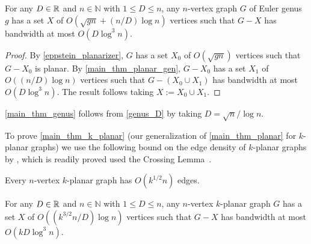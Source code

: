 \documentclass{patmorin}
\renewcommand{\leq}{\leqslant}
\newcommand{\david}[1]{{\color{orange} David: #1}}
\newcommand{\pat}[1]{\textcolor{Blue}{Pat: #1}}
\newcommand{\NN}{\mathbb{N}}
\begin{document}
\begin{lem}
\label{genus_D}
For any $D\in\mathbb{R}$ and $n\in\NN$ with $1\leq D\leq n$, any $n$-vertex graph $G$ of Euler genus $g$ has a set $X$ of $O(\sqrt{gn}+(n/D) \log n)$ vertices such that $G-X$ has bandwidth at most $O(D\log^3 n)$.
\end{lem}

\begin{proof}
By \cref{eppstein_planarizer}, $G$ has a set $X_0$ of $O(\sqrt{gn})$ vertices such that $G-X_0$ is planar.  By \cref{main_thm_planar_gen}, $G-X_0$ has a set $X_1$ of $O((n/D)\log n)$ vertices such that $G-(X_0\cup X_1)$ has bandwidth at most $O(D\log^3 n)$. The result follows taking $X:=X_0\cup X_1$.
\end{proof}

\cref{main_thm_genus} follows from \cref{genus_D} by taking $D=\sqrt{n}/\log n$.

 
To prove \cref{main_thm_k_planar} (our generalization of \cref{main_thm_planar} for $k$-planar graphs) we use the following bound on the edge density of $k$-planar graphs by \citet{PachToth97}, which is readily proved used the Crossing Lemma~\cite{ajtai.chvatal.ea:crossing_free}.



\begin{lem} 
\label{k_planar_density}
Every $n$-vertex $k$-planar graph has $O(k^{1/2} n)$ edges.
\end{lem}



\begin{lem}\label{k_planar_D}
For any $D\in\mathbb{R}$ and $n\in\NN$ with $1\leq D\leq n$, any $n$-vertex $k$-planar graph $G$ has a set $X$ of $O((k^{3/2}n/D) \log n)$ vertices such that $G-X$ has bandwidth at most $O(kD\log^3 n)$.
\end{lem}
\end{document}
